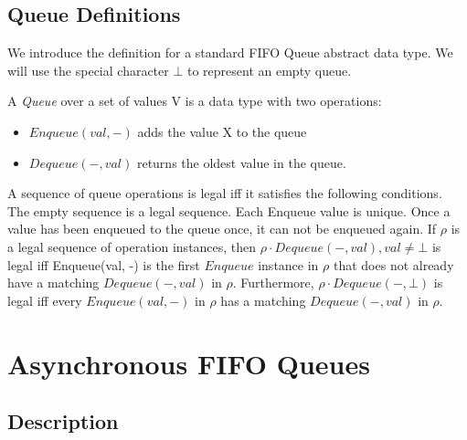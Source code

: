 \documentclass[a4paper,USenglish]{lipics-v2021} %
\begin{document}
\subsection{Queue Definitions}

We introduce the definition for a standard FIFO Queue abstract data type. We will use the special character $\bot$ to represent an empty queue.

\begin{definition} A \emph{Queue} over a set of values V is a data type with two operations:
  \begin{itemize}
  \item $Enqueue(val,-)$ adds the value X to the queue
  \item $Dequeue(-, val)$ returns the oldest value in the queue.
  \end{itemize}

  A sequence of queue operations is legal iff it satisfies the following conditions.  The empty sequence is a legal sequence.  Each Enqueue value is unique. Once a value has been enqueued to the queue once, it can not be enqueued again.  If $\rho$ is a legal sequence of operation instances, then $\rho \cdot Dequeue(-, val), val \neq \bot$ is legal iff Enqueue(val, -) is the first $Enqueue$ instance in $\rho$ that does not already have a matching $Dequeue(-, val)$ in $\rho$. Furthermore, $\rho \cdot Dequeue(-, \bot)$ is legal iff every $Enqueue(val, -)$ in $\rho$ has a matching $Dequeue(-,val)$ in $\rho$.
\end{definition}

\section{Asynchronous FIFO Queues}

\subsection{Description}
\end{document}
